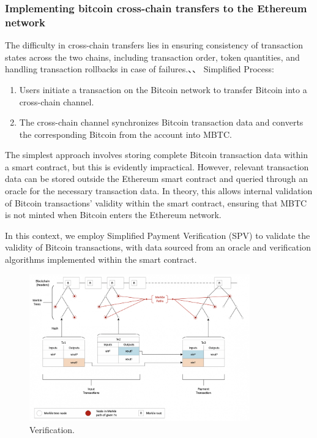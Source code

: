 \documentclass{article}
\begin{document}
\subsubsection{Implementing bitcoin cross-chain transfers to the Ethereum network}
The difficulty in cross-chain transfers lies in ensuring consistency of transaction states across the two chains, including transaction order, token quantities, and handling transaction rollbacks in case of failures.、、
Simplified Process:
\begin{enumerate}
    \item Users initiate a transaction on the Bitcoin network to transfer Bitcoin into a cross-chain channel.
    \item The cross-chain channel synchronizes Bitcoin transaction data and converts the corresponding Bitcoin from the account into MBTC.
\end{enumerate}
\par The simplest approach involves storing complete Bitcoin transaction data within a smart contract, but this is evidently impractical. However, relevant transaction data can be stored outside the Ethereum smart contract and queried through an oracle for the necessary transaction data. In theory, this allows internal validation of Bitcoin transactions' validity within the smart contract, ensuring that MBTC is not minted when Bitcoin enters the Ethereum network.
\par In this context, we employ Simplified Payment Verification (SPV) to validate the validity of Bitcoin transactions, with data sourced from an oracle and verification algorithms implemented within the smart contract.
\begin{figure}[h]
\centering
\includegraphics[width=0.85\textwidth]{spv2.png}
\caption{\label{fig:spv2}Verification.}
\end{figure}
\end{document}
